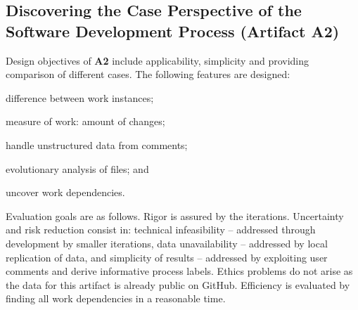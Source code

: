 %
%
%
%
%
%


\subsection{Discovering the Case Perspective of the Software Development Process (Artifact A2)} 
Design objectives of \textbf{A2} include applicability, simplicity and providing comparison of different cases. The following features are designed: 
\begin{iiilist}
	\item difference between work instances;
	\item measure of work: amount of changes;
	\item handle unstructured data from comments;
	\item evolutionary analysis of files; and
	\item uncover work dependencies.
\end{iiilist}
Evaluation goals are as follows. Rigor is assured by the iterations. Uncertainty and risk reduction consist in: technical infeasibility -- addressed through development by smaller iterations, data unavailability -- addressed by local replication of data, and simplicity of results -- addressed by exploiting user comments and derive informative process labels. Ethics problems do not arise as the data for this artifact is already public on GitHub. Efficiency is evaluated by finding all work dependencies in a reasonable time. 



